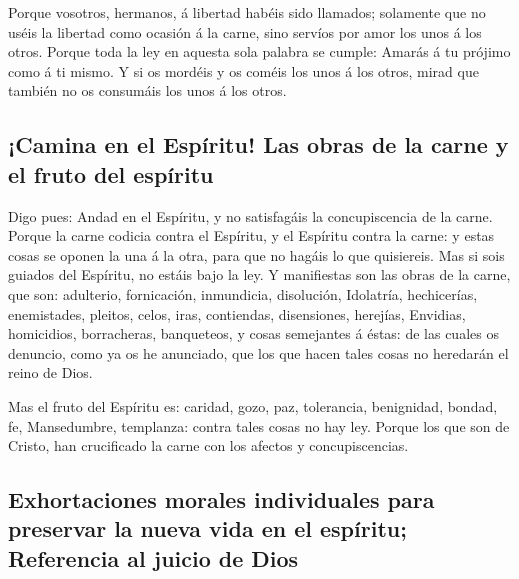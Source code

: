  Porque vosotros, hermanos, á libertad habéis sido
llamados; solamente que no uséis la libertad como ocasión á la carne,
sino servíos por amor los unos á los otros.  Porque toda
la ley en aquesta sola palabra se cumple: Amarás á tu prójimo como á ti
mismo.  Y si os mordéis y os coméis los unos á los otros,
mirad que también no os consumáis los unos á los otros.

\hypertarget{camina-en-el-espuxedritu-las-obras-de-la-carne-y-el-fruto-del-espuxedritu}{%
\subsection{¡Camina en el Espíritu! Las obras de la carne y el fruto del
espíritu}\label{camina-en-el-espuxedritu-las-obras-de-la-carne-y-el-fruto-del-espuxedritu}}

 Digo pues: Andad en el Espíritu, y no satisfagáis la
concupiscencia de la carne.  Porque la carne codicia
contra el Espíritu, y el Espíritu contra la carne: y estas cosas se
oponen la una á la otra, para que no hagáis lo que quisiereis.
 Mas si sois guiados del Espíritu, no estáis bajo la ley.
 Y manifiestas son las obras de la carne, que son:
adulterio, fornicación, inmundicia, disolución, 
Idolatría, hechicerías, enemistades, pleitos, celos, iras, contiendas,
disensiones, herejías,  Envidias, homicidios,
borracheras, banqueteos, y cosas semejantes á éstas: de las cuales os
denuncio, como ya os he anunciado, que los que hacen tales cosas no
heredarán el reino de Dios.

 Mas el fruto del Espíritu es: caridad, gozo, paz,
tolerancia, benignidad, bondad, fe,  Mansedumbre,
templanza: contra tales cosas no hay ley.  Porque los que
son de Cristo, han crucificado la carne con los afectos y
concupiscencias.

\hypertarget{exhortaciones-morales-individuales-para-preservar-la-nueva-vida-en-el-espuxedritu-referencia-al-juicio-de-dios}{%
\subsection{Exhortaciones morales individuales para preservar la nueva
vida en el espíritu; Referencia al juicio de
Dios}\label{exhortaciones-morales-individuales-para-preservar-la-nueva-vida-en-el-espuxedritu-referencia-al-juicio-de-dios}}

